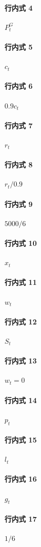 \documentclass[12pt]{article}
\begin{document}
\paragraph{行内式 4}
\(P^G_t\)
\paragraph{行内式 5}
\(c_t\)
\paragraph{行内式 6}
\(0.9c_t\)
\paragraph{行内式 7}
\(r_t\)
\paragraph{行内式 8}
\(r_t/0.9\)
\paragraph{行内式 9}
\(5000/6\)
\paragraph{行内式 10}
\(x_t\)
\paragraph{行内式 11}
\(w_t\)
\paragraph{行内式 12}
\(S_t\)
\paragraph{行内式 13}
\(w_t=0\)
\paragraph{行内式 14}
\(p_t\)
\paragraph{行内式 15}
\(l_t\)
\paragraph{行内式 16}
\(g_t\)
\paragraph{行内式 17}
\(1/6\)
\end{document}
